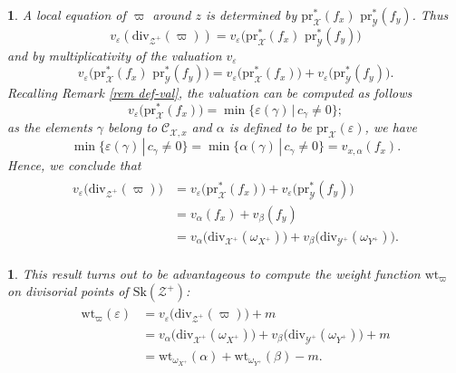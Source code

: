 \documentclass{amsart}%
\numberwithin{equation}{subsection}
\theoremstyle{plain2}
\theoremstyle{definition2}
\theoremstyle{stepstyle}
\theoremstyle{point}
\theoremstyle{subpoint}
\newtheorem{subpoint}[equation]{}%
\newcommand{\spa}[1]{\begin{subpoint}#1\end{subpoint}}           %
\newcommand{\cX}{\ensuremath{\mathscr{X}}}
\newcommand{\caC}{\ensuremath{\mathcal{C}}}
\newcommand{\cY}{\ensuremath{\mathscr{Y}}}
\newcommand{\cZ}{\ensuremath{\mathscr{Z}}}
\renewcommand{\cY}{\ensuremath{\mathscr{Y}}}
\newcommand{\pr}{\mathrm{pr}}
\newcommand{\divisor}{\mathrm{div}}
\newcommand{\weight}{\mathrm{wt}}
\newcommand{\Sk}{\mathrm{Sk}}
\begin{document}
\spa{A local equation of $\varpi$ around $z$ is determined by $\pr_{\cX}^*(f_x)\,\,\pr_{\cY}^*(f_y)$. Thus $$v_{\varepsilon}(\divisor_{\cZ^+}(\varpi))
= v_{\varepsilon}\big(\pr_{\cX}^*(f_x) \,\,\pr_{\cY}^*(f_y)\big)$$ and by multiplicativity of the valuation $v_{\varepsilon}$ $$v_{\varepsilon}\big(\pr_{\cX}^*(f_x) \,\,\pr_{\cY}^*(f_y)\big) = v_{\varepsilon}\big(\pr_{\cX}^*(f_x)\big) + v_{\varepsilon}\big(\pr_{\cY}^*(f_y)\big).$$ Recalling Remark \ref{rem def-val}, the valuation can be computed as follows $$ v_{\varepsilon}\big(\pr_{\cX}^*(f_x)\big) = \min\{\varepsilon(\gamma)\,|\,c_\gamma \neq 0\};$$ as the elements $\gamma$ belong to $\caC_{\cX,x}$ and $\alpha$ is defined to be $\pr_{\cX}(\varepsilon)$, we have $$\min\{\varepsilon(\gamma)\,|\,c_\gamma \neq 0\} = \min\{\alpha(\gamma)\,|\,c_\gamma \neq 0\} =  v_{x,\alpha}(f_x).$$ Hence, we conclude that \begin{align} \label{equ valuations product}
\begin{split}
v_{\varepsilon}\big(\divisor_{\cZ^+}(\varpi)\big)
& = v_{\varepsilon}\big(\pr_{\cX}^*(f_x)\big) + v_{\varepsilon}\big(\pr_{\cY}^*(f_y)\big)\\
& = v_{\alpha}(f_x) + v_{\beta}(f_y) \\
& = v_{\alpha}\big(\divisor_{\cX^+}(\omega_{X^+})\big) + v_{\beta}\big(\divisor_{\cY^+}(\omega_{Y^+})\big).
\end{split}
\end{align}
}

\spa{This result turns out to be advantageous to compute the weight function $\weight_\varpi$ on divisorial points of $\Sk(\cZ^+)$: 
\begin{align} \label{equ weight function product}
\begin{split}
\weight_\varpi(\varepsilon)
& = v_{\varepsilon}\big(\divisor_{\cZ^+}(\varpi)\big) +m \\
& = v_{\alpha}\big(\divisor_{\cX^+}(\omega_{X^+})\big) + v_{\beta}\big(\divisor_{\cY^+}(\omega_{Y^+})\big) + m \\
& = \weight_{\omega_{X^+}}(\alpha) + \weight_{\omega_{Y^+}}(\beta) - m.
\end{split}
\end{align}
}
\end{document}

